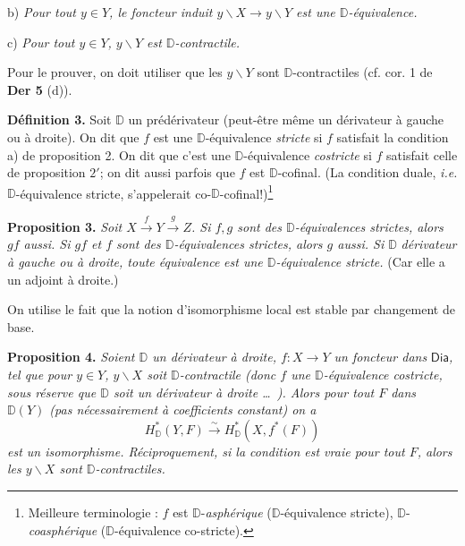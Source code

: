 \documentclass[11pt,leqno]{article}
\newcommand{\printedpage}[1]{\marginpar{\footnotesize p.~#1}}
\newcommand{\msp}[1]{\marginpar{\footnotesize [#1]}}
\newcommand{\DD}{\mathbb{D}}
\newcommand{\Dia}{\mathsf{Dia}}
\newcommand{\isolongto}{\overset{\sim}{\longrightarrow}}
\begin{document}
b) \textit{Pour tout $y \in Y$, le foncteur induit $y\backslash X \to y\backslash Y$ est une $\DD$-équivalence.}

c) \textit{Pour tout $y \in Y$, $y\backslash Y$ est $\DD$-contractile.}

\noindent Pour le prouver, on doit utiliser que les $y\backslash Y$ sont $\DD$-contractiles (cf. cor. 1 de \textbf{Der 5} (d)).

\clearpage
\printedpage{38}
\noindent\msp{page 65}

\noindent\textbf{Définition 3.} Soit $\DD$ un prédérivateur (peut-être même un dérivateur à gauche ou à droite). On dit que $f$ est une $\DD$-équivalence \textit{stricte} si $f$ satisfait la condition a) de proposition 2. On dit que c'est une $\DD$-équivalence \textit{costricte} si $f$ satisfait celle de proposition $2'$; on dit aussi parfois que $f$ est $\DD$-cofinal. (La condition duale, \textit{i.e.} $\DD$-équivalence stricte, s'appelerait co-$\DD$-cofinal!)\footnote[27]{Meilleure terminologie : $f$ est $\DD$-\textit{asphérique} ($\DD$-équivalence stricte), $\DD$-\textit{coasphérique} ($\DD$-équivalence co-stricte).} %

\noindent\textbf{Proposition 3.} \textit{Soit $X \overset{f}{\to} Y \overset{g}{\to} Z$. Si $f, g$ sont des $\DD$-équivalences strictes, alors $gf$ aussi. Si $gf$ et $f$ sont des $\DD$-équivalences strictes, alors $g$ aussi. Si $\DD$} \textit{dérivateur à gauche ou à droite, toute équivalence} \textit{est une $\DD$-équivalence stricte.} (Car elle a un adjoint à droite.)

On utilise le fait que la notion d'isomorphisme local est stable par changement de base.

\noindent\msp{page 66}

\noindent\textbf{Proposition 4.} \textit{Soient $\DD$ un dérivateur à droite, $f : X \to Y$ un foncteur dans} $\Dia$\textit{, tel que pour $y \in Y$, $y\backslash X$ soit $\DD$-contractile (donc $f$ une $\DD$-équivalence costricte, sous réserve que $\DD$ soit un dérivateur à droite \ldots\ ). Alors pour tout $F$ dans $\DD(Y)$ (pas nécessairement à coefficients constant) on a} %
\[
H^*_{\DD}(Y, F) \isolongto H^*_{\DD}(X, f^*(F))
\]
\textit{est un isomorphisme. Réciproquement, si la condition est vraie pour tout $F$, alors les $y\backslash X$ sont $\DD$-contractiles.}
\end{document}
